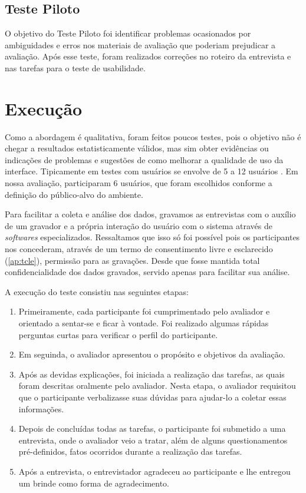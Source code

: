 \subsection{Teste Piloto}

O objetivo do Teste Piloto foi identificar problemas ocasionados por ambiguidades e erros nos materiais de avaliação que poderiam prejudicar a avaliação. Após esse teste, foram realizados correções no roteiro da entrevista e nas tarefas para o teste de usabilidade.

\section{Execução}

Como a abordagem é qualitativa, foram feitos poucos testes, pois o objetivo não é chegar a resultados estatisticamente válidos, mas sim obter evidências ou indicações de problemas e sugestões de como melhorar a qualidade de uso da interface. Tipicamente em testes com usuários se envolve de 5 a 12 usuários \cite{dumas1999practical}. Em nossa avaliação, participaram 6 usuários, que foram escolhidos conforme a definição do público-alvo do ambiente.

Para facilitar a coleta e análise dos dados, gravamos as entrevistas com o auxílio de um gravador e a própria interação do usuário com o sistema através de \textit{softwares} especializados. Ressaltamos que isso só foi possível pois os participantes nos concederam, através de um termo de consentimento livre e esclarecido (\autoref{ap:tcle}), permissão para as gravações. Desde que fosse mantida total confidencialidade dos dados gravados, servido apenas para facilitar sua análise.

A execução do teste consistiu nas seguintes etapas:
\begin{enumerate}
	\item Primeiramente, cada participante foi cumprimentado pelo avaliador e orientado a sentar-se e ficar à vontade. Foi realizado algumas rápidas perguntas curtas para verificar o perfil do participante.
	\item Em seguinda, o avaliador apresentou o propósito e objetivos da avaliação.   
	\item Após as devidas explicações, foi iniciada a realização das tarefas, as quais foram descritas oralmente pelo avaliador. Nesta etapa, o avaliador requisitou que o participante verbalizasse suas dúvidas para ajudar-lo a coletar essas informações.
	\item Depois de concluídas todas as tarefas, o participante foi submetido a uma entrevista, onde o avaliador veio a tratar, além de alguns questionamentos pré-definidos, fatos ocorridos durante a realização das tarefas.
	\item Após a entrevista, o entrevistador agradeceu ao participante e lhe entregou um brinde como forma de agradecimento.  
\end{enumerate}

